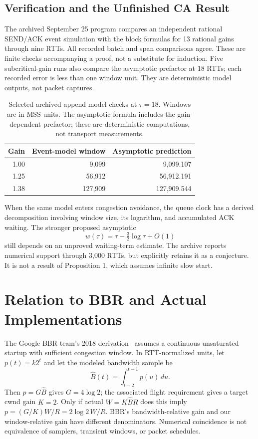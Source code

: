 \documentclass[conference,letterpaper]{IEEEtran}
\begin{document}
\subsection{Verification and the Unfinished CA Result}
The archived September 25 program compares an independent rational SEND/ACK event simulation with the block formulas for 13 rational gains through nine RTTs. All recorded batch and span comparisons agree. These are finite checks accompanying a proof, not a substitute for induction. Five subcritical-gain runs also compare the asymptotic prefactor at 18 RTTs; each recorded error is less than one window unit. They are deterministic model outputs, not packet captures.

\begin{table}[t]
\caption{Selected archived append-model checks at $\tau=18$. Windows are in MSS units. The asymptotic formula includes the gain-dependent prefactor; these are deterministic computations, not transport measurements.}
\centering\small
\begin{tabular}{rrr}
\toprule
Gain & Event-model window & Asymptotic prediction\\\midrule
1.00 & 9,099 & 9,099.107\\
1.25 & 56,912 & 56,912.191\\
1.38 & 127,909 & 127,909.544\\\bottomrule
\end{tabular}
\end{table}

When the same model enters congestion avoidance, the queue clock has a derived decomposition involving window size, its logarithm, and accumulated ACK waiting. The stronger proposed asymptotic
\begin{equation}
w(\tau)=\tau-\tfrac32\log\tau+O(1)
\end{equation}
still depends on an unproved waiting-term estimate. The archive reports numerical support through 3,000 RTTs, but explicitly retains it as a conjecture. It is not a result of Proposition 1, which assumes infinite slow start.

\section{Relation to BBR and Actual Implementations}
The Google BBR team's 2018 derivation~\cite{bbrgain,bbrcwnd} assumes a continuous unsaturated startup with sufficient congestion window. In RTT-normalized units, let $p(t)=k2^t$ and let the modeled bandwidth sample be
\begin{equation}
\widehat B(t)=\int_{t-2}^{t-1}p(u)\,du.
\end{equation}
Then $p=G\widehat B$ gives $G=4\log2$; the associated flight requirement gives a target cwnd gain $K=2$. Only if actual $W=K\widehat BR$ does this imply $p=(G/K)W/R=2\log2\,W/R$. BBR's bandwidth-relative gain and our window-relative gain have different denominators. Numerical coincidence is not equivalence of samplers, transient windows, or packet schedules.
\end{document}
